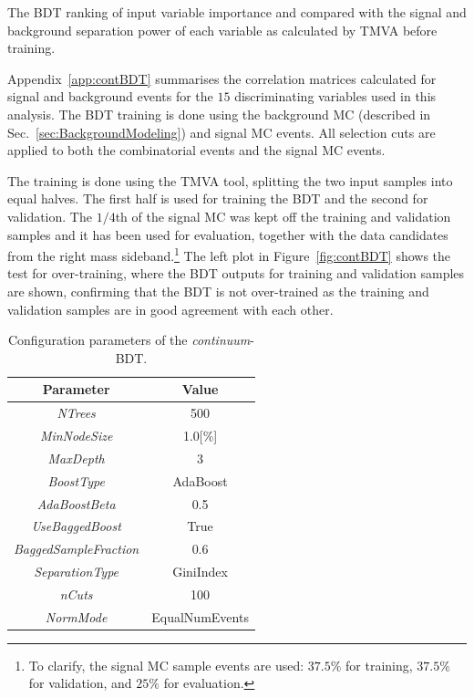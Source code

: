 \begin{table}[!htb]
\begin{center}

\caption{The BDT ranking of input variable importance and compared with the signal and background 
separation power of each variable as calculated by TMVA before training.}
\label{tab:VarImportance}
\end{center}
\end{table}
 
Appendix~\ref{app:contBDT} summarises the correlation matrices calculated
for signal and background events for the $15$ discriminating variables used
in this analysis.
The BDT training is done using the \bbmumuX background MC (described in
Sec.~\ref{sec:BackgroundModeling}) and signal MC events. All selection cuts are applied to both the combinatorial events and the signal MC events. 
 
The training is done using the TMVA tool, splitting the two input samples into
equal halves. The first half is used for training the BDT and the second for
validation.
The $1/4$th of the signal MC was kept off the training and validation samples and
it has been used for evaluation, together with the data candidates from the right
mass sideband.\footnote{To clarify, the signal MC sample events are used:
$37.5\%$ for training, $37.5\%$ for validation, and $25\%$ for evaluation.}
The left plot in Figure~\ref{fig:contBDT} shows the test for over-training,
where the BDT outputs for training and validation samples are shown, confirming that
the BDT is not over-trained as the training and validation samples are in good
agreement with each other. 
 
\begin{table}[htbp]
\begin{center}
\begin{tabular}{|c|c|}
\hline
Parameter & Value \\
\hline
\hline
\textit{NTrees} & 500 \\
\hline
\textit{MinNodeSize} & 1.0[\%]\\
\hline
\textit{MaxDepth} & 3 \\
\hline
\textit{BoostType} & AdaBoost \\
\hline
\textit{AdaBoostBeta} & 0.5 \\
\hline
\textit{UseBaggedBoost} & True\\
\hline
\textit{BaggedSampleFraction} & 0.6\\
\hline
\textit{SeparationType} & GiniIndex \\
\hline
\textit{nCuts} & 100\\
\hline
\textit{NormMode} & EqualNumEvents\\
\hline
\hline
\end{tabular}
\end{center}
\caption{\label{tab:cBDTPars} Configuration parameters of the \textit{continuum}-BDT.}
\end{table}
 
